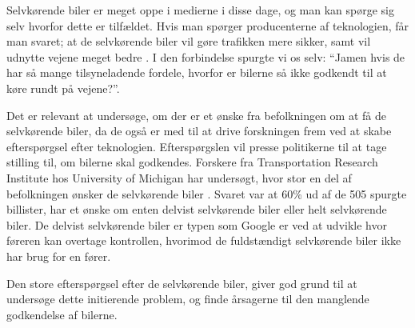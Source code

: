 Selvkørende biler er meget oppe i medierne i disse dage, og man kan spørge sig selv hvorfor dette er tilfældet. Hvis man spørger producenterne af teknologien, får man svaret; at de selvkørende biler vil gøre trafikken mere sikker, samt vil udnytte vejene meget bedre \cite{GOOG_SITE}. I den forbindelse spurgte vi os selv: ``Jamen hvis de har så mange tilsyneladende fordele, hvorfor er bilerne så ikke godkendt til at køre rundt på vejene?''. 

Det er relevant at undersøge, om der er et ønske fra befolkningen om at få de selvkørende biler, da de også er med til at drive forskningen frem ved at skabe efterspørgsel efter teknologien. Efterspørgslen vil presse politikerne til at tage stilling til, om bilerne skal godkendes. Forskere fra Transportation Research Institute hos University of Michigan har undersøgt, hvor stor en del af befolkningen ønsker de selvkørende biler \cite{UMTRI}. Svaret var at 60\% ud af de 505 spurgte billister, har et ønske om enten delvist selvkørende biler eller helt selvkørende biler. De delvist selvkørende biler er typen som Google er ved at udvikle hvor føreren kan overtage kontrollen, hvorimod de fuldstændigt selvkørende biler ikke har brug for en fører.

Den store efterspørgsel efter de selvkørende biler, giver god grund til at undersøge dette initierende problem, og finde årsagerne til den manglende godkendelse af bilerne.